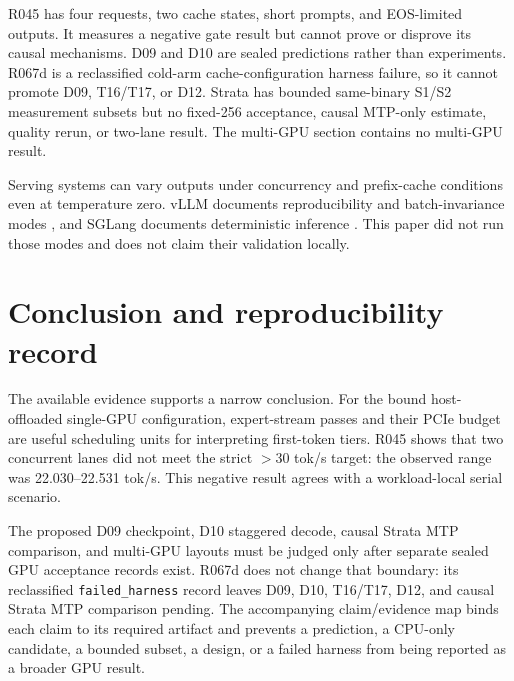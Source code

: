 \documentclass[11pt]{article}
\begin{document}
R045 has four requests, two cache states, short prompts, and EOS-limited outputs. It measures a negative gate result but cannot prove or disprove its causal mechanisms. D09 and D10 are sealed predictions rather than experiments. R067d is a reclassified cold-arm cache-configuration harness failure, so it cannot promote D09, T16/T17, or D12. Strata has bounded same-binary S1/S2 measurement subsets but no fixed-256 acceptance, causal MTP-only estimate, quality rerun, or two-lane result. The multi-GPU section contains no multi-GPU result.

Serving systems can vary outputs under concurrency and prefix-cache conditions even at temperature zero. vLLM documents reproducibility and batch-invariance modes \cite{vllmrepro,vllmbatch}, and SGLang documents deterministic inference \cite{sglang}. This paper did not run those modes and does not claim their validation locally.

\section{Conclusion and reproducibility record}

The available evidence supports a narrow conclusion. For the bound host-offloaded single-GPU configuration, expert-stream passes and their PCIe budget are useful scheduling units for interpreting first-token tiers. R045 shows that two concurrent lanes did not meet the strict $>30$ tok/s target: the observed range was 22.030--22.531 tok/s. This negative result agrees with a workload-local serial scenario.

The proposed D09 checkpoint, D10 staggered decode, causal Strata MTP comparison, and multi-GPU layouts must be judged only after separate sealed GPU acceptance records exist. R067d does not change that boundary: its reclassified \texttt{failed\_harness} record leaves D09, D10, T16/T17, D12, and causal Strata MTP comparison pending. The accompanying claim/evidence map binds each claim to its required artifact and prevents a prediction, a CPU-only candidate, a bounded subset, a design, or a failed harness from being reported as a broader GPU result.



\end{document}

